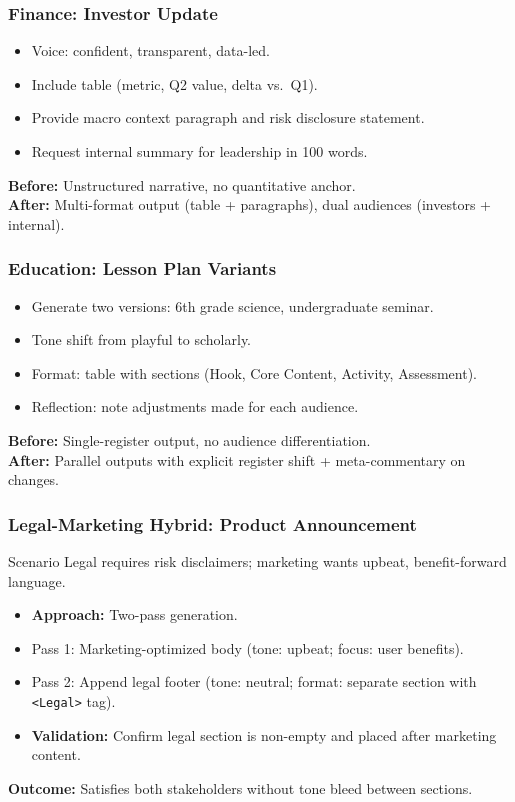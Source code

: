 \documentclass{beamer}
\begin{document}
\begin{frame}
    \frametitle{Finance: Investor Update}
    \begin{itemize}
        \item Voice: confident, transparent, data-led.
        \item Include table (metric, Q2 value, delta vs.\ Q1).
        \item Provide macro context paragraph and risk disclosure statement.
        \item Request internal summary for leadership in 100 words.
    \end{itemize}
    \vspace{0.3cm}
    \textbf{Before:} Unstructured narrative, no quantitative anchor.\\
    \textbf{After:} Multi-format output (table + paragraphs), dual audiences (investors + internal).
\end{frame}

\begin{frame}
    \frametitle{Education: Lesson Plan Variants}
    \begin{itemize}
        \item Generate two versions: 6th grade science, undergraduate seminar.
        \item Tone shift from playful to scholarly.
        \item Format: table with sections (Hook, Core Content, Activity, Assessment).
        \item Reflection: note adjustments made for each audience.
    \end{itemize}
    \vspace{0.3cm}
    \textbf{Before:} Single-register output, no audience differentiation.\\
    \textbf{After:} Parallel outputs with explicit register shift + meta-commentary on changes.
\end{frame}

\begin{frame}
    \frametitle{Legal-Marketing Hybrid: Product Announcement}
    \begin{block}{Scenario}
        Legal requires risk disclaimers; marketing wants upbeat, benefit-forward language.
    \end{block}
    \begin{itemize}
        \item \textbf{Approach:} Two-pass generation.
        \item Pass 1: Marketing-optimized body (tone: upbeat; focus: user benefits).
        \item Pass 2: Append legal footer (tone: neutral; format: separate section with \texttt{<Legal>} tag).
        \item \textbf{Validation:} Confirm legal section is non-empty and placed after marketing content.
    \end{itemize}
    \vspace{0.2cm}
    \textbf{Outcome:} Satisfies both stakeholders without tone bleed between sections.
\end{frame}
\end{document}

